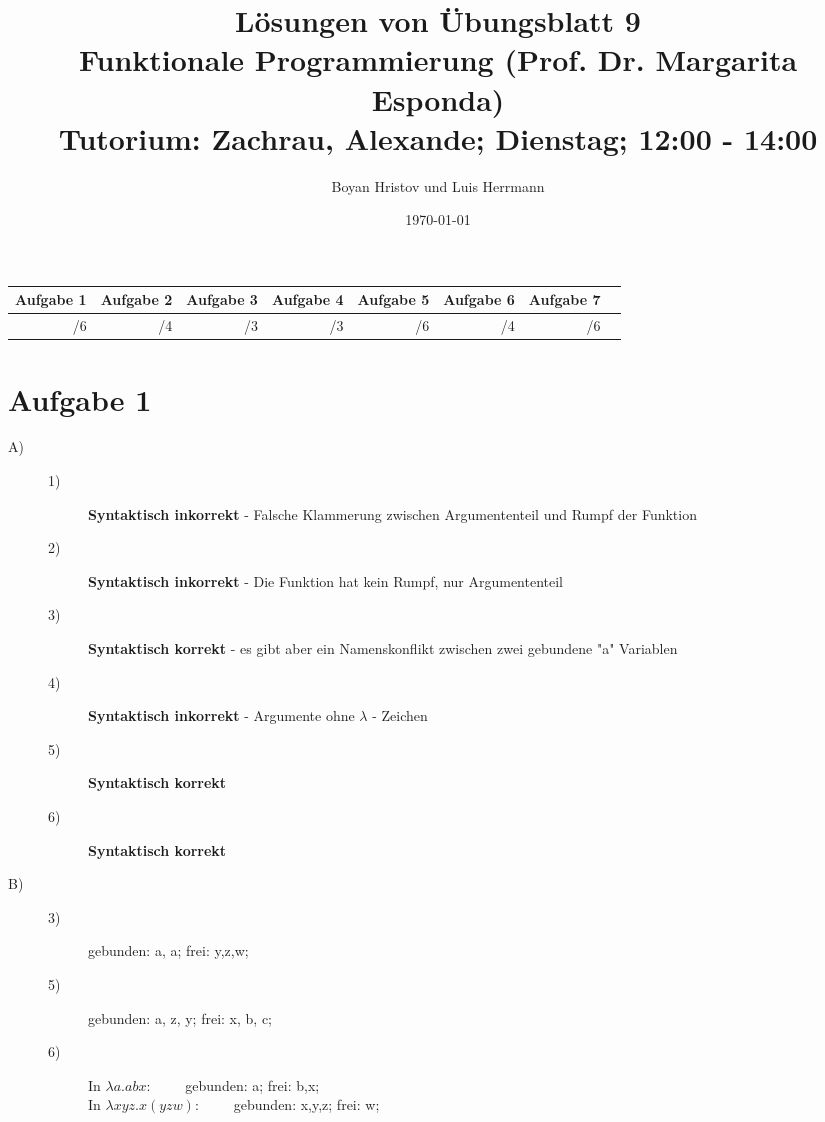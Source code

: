 \documentclass[11]{article}
\begin{document}
\title
{
L\"osungen von \"Ubungsblatt 9 \\
Funktionale Programmierung (Prof. Dr. Margarita Esponda) \\
\normalsize Tutorium: Zachrau, Alexande; Dienstag; 12:00 - 14:00
}
\author{Boyan Hristov und Luis Herrmann}
\date{\today}
\maketitle

\begin{tabular}{|r|r|r|r|r|r|r|r}
\hline 
Aufgabe 1 & Aufgabe 2 & Aufgabe 3 & Aufgabe 4 & Aufgabe 5 & Aufgabe 6 & Aufgabe 7 \\ 
\hline 
/6 & /4 & /3 & /3 & /6 & /4 & /6\\ 
\hline 
\end{tabular}
%
\section*{Aufgabe 1}
\begin{description}
\item[A)] \textbf{}
\begin{description}
\item[1)] \textbf{Syntaktisch inkorrekt} - Falsche Klammerung zwischen Argumententeil und Rumpf der Funktion 
\item[2)] \textbf{Syntaktisch inkorrekt} - Die Funktion hat kein Rumpf, nur Argumententeil
\item[3)] \textbf{Syntaktisch korrekt} - es gibt aber ein Namenskonflikt zwischen zwei gebundene "a" Variablen
\item[4)] \textbf{Syntaktisch inkorrekt} - Argumente ohne $\lambda$ - Zeichen
\item[5)] \textbf{Syntaktisch korrekt}
\item[6)] \textbf{Syntaktisch korrekt}
\end{description}
%
\item[B)] \textbf{}
\begin{description}
\item[3)] gebunden: a, a; \; frei: y,z,w;
\item[5)] gebunden: a, z, y; \; frei: x, b, c;
\item[6)] \text{ } In $\lambda a.abx: \qquad$ gebunden: a; \; frei: b,x; \\
In $\lambda xyz.x(yzw): \qquad$ gebunden: x,y,z; \; frei: w;
\end{description}
\end{description}
%
\end{document}
